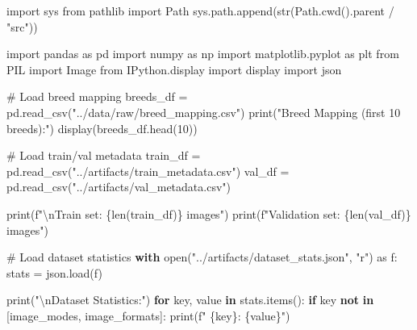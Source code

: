 \documentclass[
  letterpaper,
  DIV=11,
  numbers=noendperiod]{scrartcl}
\newenvironment{Shaded}{\begin{snugshade}}{\end{snugshade}}
\newcommand{\BuiltInTok}[1]{\textcolor[rgb]{0.00,0.23,0.31}{#1}}
\newcommand{\CharTok}[1]{\textcolor[rgb]{0.13,0.47,0.30}{#1}}
\newcommand{\CommentTok}[1]{\textcolor[rgb]{0.37,0.37,0.37}{#1}}
\newcommand{\ControlFlowTok}[1]{\textcolor[rgb]{0.00,0.23,0.31}{\textbf{#1}}}
\newcommand{\DecValTok}[1]{\textcolor[rgb]{0.68,0.00,0.00}{#1}}
\newcommand{\ImportTok}[1]{\textcolor[rgb]{0.00,0.46,0.62}{#1}}
\newcommand{\KeywordTok}[1]{\textcolor[rgb]{0.00,0.23,0.31}{\textbf{#1}}}
\newcommand{\NormalTok}[1]{\textcolor[rgb]{0.00,0.23,0.31}{#1}}
\newcommand{\OperatorTok}[1]{\textcolor[rgb]{0.37,0.37,0.37}{#1}}
\newcommand{\SpecialCharTok}[1]{\textcolor[rgb]{0.37,0.37,0.37}{#1}}
\newcommand{\SpecialStringTok}[1]{\textcolor[rgb]{0.13,0.47,0.30}{#1}}
\newcommand{\StringTok}[1]{\textcolor[rgb]{0.13,0.47,0.30}{#1}}
\renewenvironment{Shaded}{%
  \begin{tcolorbox}[%
    enhanced,%
    colback=codebg,%
    colframe=codebg,%
    borderline west={3pt}{0pt}{sectionblue},%
    boxrule=0pt,%
    arc=0pt,%
    boxsep=5pt,%
    left=2mm,%
    right=2mm,%
    top=2mm,%
    bottom=2mm%
  ]%
}{%
  \end{tcolorbox}%
}
\begin{document}
\begin{Shaded}
\begin{Highlighting}[]
\ImportTok{import}\NormalTok{ sys}
\ImportTok{from}\NormalTok{ pathlib }\ImportTok{import}\NormalTok{ Path}
\NormalTok{sys.path.append(}\BuiltInTok{str}\NormalTok{(Path.cwd().parent }\OperatorTok{/} \StringTok{"src"}\NormalTok{))}

\ImportTok{import}\NormalTok{ pandas }\ImportTok{as}\NormalTok{ pd}
\ImportTok{import}\NormalTok{ numpy }\ImportTok{as}\NormalTok{ np}
\ImportTok{import}\NormalTok{ matplotlib.pyplot }\ImportTok{as}\NormalTok{ plt}
\ImportTok{from}\NormalTok{ PIL }\ImportTok{import}\NormalTok{ Image}
\ImportTok{from}\NormalTok{ IPython.display }\ImportTok{import}\NormalTok{ display}
\ImportTok{import}\NormalTok{ json}

\CommentTok{\# Load breed mapping}
\NormalTok{breeds\_df }\OperatorTok{=}\NormalTok{ pd.read\_csv(}\StringTok{"../data/raw/breed\_mapping.csv"}\NormalTok{)}
\BuiltInTok{print}\NormalTok{(}\StringTok{"Breed Mapping (first 10 breeds):"}\NormalTok{)}
\NormalTok{display(breeds\_df.head(}\DecValTok{10}\NormalTok{))}

\CommentTok{\# Load train/val metadata}
\NormalTok{train\_df }\OperatorTok{=}\NormalTok{ pd.read\_csv(}\StringTok{"../artifacts/train\_metadata.csv"}\NormalTok{)}
\NormalTok{val\_df }\OperatorTok{=}\NormalTok{ pd.read\_csv(}\StringTok{"../artifacts/val\_metadata.csv"}\NormalTok{)}

\BuiltInTok{print}\NormalTok{(}\SpecialStringTok{f"}\CharTok{\textbackslash{}n}\SpecialStringTok{Train set: }\SpecialCharTok{\{}\BuiltInTok{len}\NormalTok{(train\_df)}\SpecialCharTok{\}}\SpecialStringTok{ images"}\NormalTok{)}
\BuiltInTok{print}\NormalTok{(}\SpecialStringTok{f"Validation set: }\SpecialCharTok{\{}\BuiltInTok{len}\NormalTok{(val\_df)}\SpecialCharTok{\}}\SpecialStringTok{ images"}\NormalTok{)}

\CommentTok{\# Load dataset statistics}
\ControlFlowTok{with} \BuiltInTok{open}\NormalTok{(}\StringTok{"../artifacts/dataset\_stats.json"}\NormalTok{, }\StringTok{"r"}\NormalTok{) }\ImportTok{as}\NormalTok{ f:}
\NormalTok{    stats }\OperatorTok{=}\NormalTok{ json.load(f)}
    
\BuiltInTok{print}\NormalTok{(}\StringTok{"}\CharTok{\textbackslash{}n}\StringTok{Dataset Statistics:"}\NormalTok{)}
\ControlFlowTok{for}\NormalTok{ key, value }\KeywordTok{in}\NormalTok{ stats.items():}
    \ControlFlowTok{if}\NormalTok{ key }\KeywordTok{not} \KeywordTok{in}\NormalTok{ [}\StringTok{\textquotesingle{}image\_modes\textquotesingle{}}\NormalTok{, }\StringTok{\textquotesingle{}image\_formats\textquotesingle{}}\NormalTok{]:}
        \BuiltInTok{print}\NormalTok{(}\SpecialStringTok{f"  }\SpecialCharTok{\{}\NormalTok{key}\SpecialCharTok{\}}\SpecialStringTok{: }\SpecialCharTok{\{}\NormalTok{value}\SpecialCharTok{\}}\SpecialStringTok{"}\NormalTok{)}
        

\end{Highlighting}
\end{Shaded}
\end{document}
